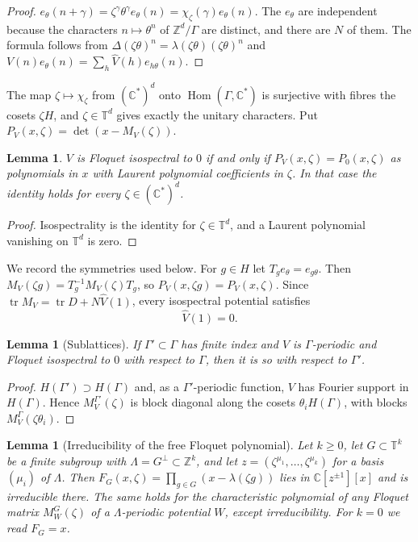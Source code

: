 \documentclass[11pt,reqno]{amsart}
\newtheorem{lemma}[theorem]{Lemma}
\theoremstyle{definition}
\theoremstyle{remark}
\newcommand{\C}{\mathbb C}
\newcommand{\Z}{\mathbb Z}
\newcommand{\T}{\mathbb T}
\DeclareMathOperator{\tr}{tr}
\begin{document}
\begin{proof}
$e_\theta(n+\gamma)=\zeta^\gamma\theta^\gamma e_\theta(n)=\chi_\zeta(\gamma)e_\theta(n)$.
The $e_\theta$ are independent because the characters $n\mapsto\theta^n$ of
$\Z^d/\Gamma$ are distinct, and there are $N$ of them.  The formula follows
from $\Delta(\zeta\theta)^n=\lambda(\zeta\theta)(\zeta\theta)^n$ and
$V(n)e_\theta(n)=\sum_h\widehat V(h)e_{h\theta}(n)$.
\end{proof}

The map $\zeta\mapsto\chi_\zeta$ from $(\C^*)^d$ onto $\operatorname{Hom}(\Gamma,\C^*)$
is surjective with fibres the cosets $\zeta H$, and $\zeta\in\T^d$ gives
exactly the unitary characters.  Put $P_V(x,\zeta)=\det(x-M_V(\zeta))$.

\begin{lemma}\label{lem:laurent}
$V$ is Floquet isospectral to $0$ if and only if $P_V(x,\zeta)=P_0(x,\zeta)$
as polynomials in $x$ with Laurent polynomial coefficients in $\zeta$.  In that
case the identity holds for every $\zeta\in(\C^*)^d$.
\end{lemma}

\begin{proof}
Isospectrality is the identity for $\zeta\in\T^d$, and a Laurent polynomial
vanishing on $\T^d$ is zero.
\end{proof}

We record the symmetries used below.  For $g\in H$ let $T_g e_\theta=e_{g\theta}$.
Then $M_V(\zeta g)=T_g^{-1}M_V(\zeta)T_g$, so $P_V(x,\zeta g)=P_V(x,\zeta)$.
Since $\tr M_V=\tr D+N\widehat V(1)$, every isospectral potential satisfies
\begin{equation}\label{eq:mean}
 \widehat V(1)=0 .
\end{equation}

\begin{lemma}[Sublattices]\label{lem:sublattice}
If $\Gamma'\subset\Gamma$ has finite index and $V$ is $\Gamma$-periodic and
Floquet isospectral to $0$ with respect to $\Gamma$, then it is so with respect
to $\Gamma'$.
\end{lemma}

\begin{proof}
$H(\Gamma')\supset H(\Gamma)$ and, as a $\Gamma'$-periodic function, $V$ has
Fourier support in $H(\Gamma)$.  Hence $M^{\Gamma'}_V(\zeta)$ is block diagonal
along the cosets $\theta_iH(\Gamma)$, with blocks $M^{\Gamma}_V(\zeta\theta_i)$.
\end{proof}

\begin{lemma}[Irreducibility of the free Floquet polynomial]\label{lem:irreducible}
Let $k\ge0$, let $G\subset\T^k$ be a finite subgroup with $\Lambda=G^\perp\subset\Z^k$,
and let $z=(\zeta^{\mu_1},\dots,\zeta^{\mu_k})$ for a basis $(\mu_i)$ of $\Lambda$.
Then $F_G(x,\zeta)=\prod_{g\in G}(x-\lambda(\zeta g))$ lies in $\C[z^{\pm1}][x]$
and is irreducible there.  The same holds for the characteristic polynomial of
any Floquet matrix $M^G_W(\zeta)$ of a $\Lambda$-periodic potential $W$, except
irreducibility.  For $k=0$ we read $F_G=x$.
\end{lemma}
\end{document}
